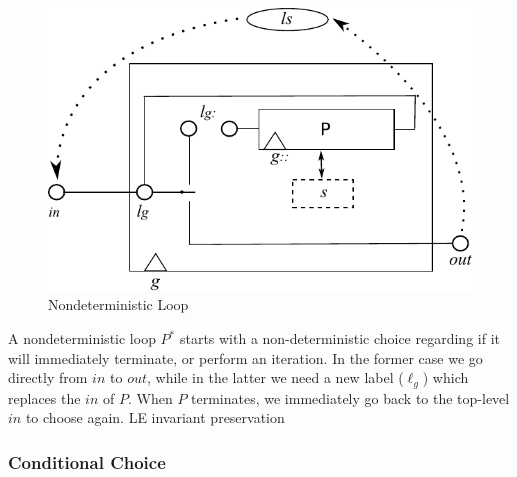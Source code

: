\begin{figure}[h]
  \centering
  \includegraphics{images/kleene-star-actual}
  \caption{Nondeterministic Loop}
  \label{fig:nondet-loop}
\end{figure}

A nondeterministic loop $P^*$  starts with a non-deterministic choice
regarding if it will immediately terminate,
or perform an iteration.
In the former case we go directly from $in$ to $out$,
while in the latter we need a new label ($\ell_g$)
which replaces the $in$ of $P$.
When $P$ terminates, we immediately go back to the top-level $in$
to choose again.
LE invariant preservation


\newpage
\subsubsection{Conditional Choice}

